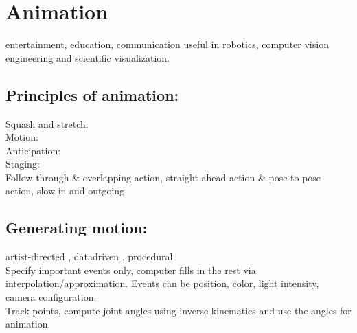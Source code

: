 \section{Animation}
 entertainment, education, communication useful in robotics, computer vision engineering and scientific visualization.
\subsection*{Principles of animation:} 
Squash and stretch: \\
Motion: \\
Anticipation: \\
Staging: \\
Follow through \& overlapping action, straight ahead action \& pose-to-pose action, slow in and outgoing
\subsection*{Generating motion:} 
artist-directed , datadriven , procedural \\
 Specify important events only, computer fills in the rest via interpolation/approximation. Events can be position, color, light intensity, camera configuration.\\
 Track points, compute joint angles using inverse kinematics and use the angles for animation.